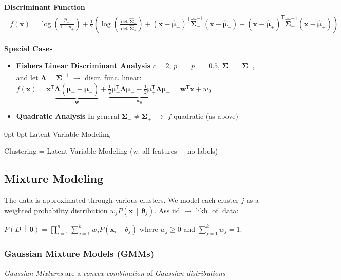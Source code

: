 \documentclass[a4paper,8pt,landscape]{extarticle}
\makeatletter
\newcommand{\cProb}[2]{P\left( #1 \,\middle|\, #2 \right)}
\newcommand*{\T}{\mathsf{T}}
\newcommand{\mat}[1]{\mathbf{#1}}
\renewcommand{\vec}[1]{\mathbf{#1}}
\newcommand{\vw}{\vec{w}}
\newcommand{\vx}{\vec{x}}
\newcommand{\vmu}{\boldsymbol{\mu}}
\newcommand{\vtheta}{\boldsymbol{\theta}}
\newcommand{\MSigma}{\mat{\Sigma}}
\newcommand{\MLambda}{\mat{\Lambda}}
\newcommand*{\mybox}[1]{%
    \noindent\colorbox{sectionbarcolor}{%
        \parbox{\dimexpr\columnwidth-2\fboxsep\relax}{%
            \textcolor{white}{#1}}}}
\newcommand*{\mybox}[1]{%
    \noindent\colorbox{sectioncolor}{%
        \parbox{\dimexpr\columnwidth-2\fboxsep\relax}{%
            \textcolor{white}{#1}}}}
\renewcommand\section{\@startsection {section}{1}{\z@}%
                                   {0pt}%
                                   {0pt}%
                                   {\normalfont\bfseries\mybox}}
\makeatother
\begin{document}
\begin{multicols*}{3}
\textbf{Discriminant Function}
\begin{gather*}
\begin{align*}
f(\vx) = \log\left(\frac{p_+}{1-p_+}\right)+\frac{1}{2}\left(
\log\left(\frac{\det{\hat{\MSigma}_-}}{\det{\hat{\MSigma}_+}}\right)
+(\vx-\hat{\vmu}_-)^\T\hat{\MSigma}_-^{-1}(\vx-\hat{\vmu}_-)
-(\vx-\hat{\vmu}_+)^\T\hat{\MSigma}_+^{-1}(\vx-\hat{\vmu}_+)
\right)
\end{align*}
\end{gather*}

\textbf{Special Cases}
\begin{itemize}
  \item \textbf{Fishers Linear Discriminant Analysis} $c=2$, $p_+=p_-=0.5$,
  $\MSigma_-=\MSigma_+$, and let $\MLambda=\MSigma^{-1}$ $\to$ discr. func.
  linear:\\
  $f(\vx)=\vx^\T\underbrace{\MLambda(\vmu_+-\vmu_-)}_{\vw}+
  \underbrace{\frac{1}{2}\vmu_-^\T\MLambda\vmu_-
  -\frac{1}{2}\vmu_+^\T\MLambda\vmu_+}_{w_0}=\vw^\T\vx + w_0$\\
  \item \textbf{Quadratic Analysis} In general $\MSigma_-\neq\MSigma_+$
  $\to$ $f$ quadratic (as above)
\end{itemize}

\section{Latent Variable Modeling}

Clustering = Latent Variable Modeling (w. all features + no labels)

\subsection{Mixture Modeling}

The data is approximated through various clusters. We model each cluster $j$ as
a weighted probability distribution $w_j\cProb{\vx}{\vtheta_j}$. Ass iid $\to$
likh.
of. data:

$\cProb{D}{\vtheta}=\prod_{i=1}^n\sum_{j=1}^k w_j\cProb{\vx_i}{\theta_j}$
where $w_j\geq 0$ and $\sum_{j=1}^k w_j=1$.

\subsubsection{Gaussian Mixture Models (GMMs)}

\emph{Gaussian Mixtures} are a \emph{convex-combination} of \emph{Gaussian
distributions}


\end{multicols*}
\end{document}
